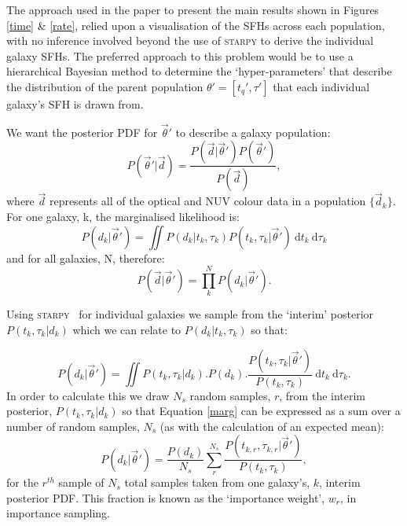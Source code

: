 \documentclass[useAMS,usenatbib]{mn2e}
\def\secondchange    {\color{srv} }
\begin{document}
{\secondchange The approach used in the paper to present the main results shown in Figures \ref{time} \& \ref{rate}, relied upon a visualisation of the SFHs across each population, with no inference involved beyond the use of \textsc{starpy} to derive the individual galaxy SFHs. The preferred approach to this problem would be to use a hierarchical Bayesian method to determine the `hyper-parameters' that describe the distribution of the parent population $\theta' = [t_q', \tau']$ that each individual galaxy's SFH is drawn from. 

We want the posterior PDF for $\vec{\theta}'$ to describe a galaxy population:
\begin{equation}\label{hyper}
P(\vec{\theta}'|\vec{d}) = \frac{P(\vec{d}|\vec{\theta}')P(\vec{\theta}')}{P(\vec{d})}, 
\end{equation}
where $\vec{d}$ represents all of the optical and NUV colour data in a population $\{\vec{d}_k\}$. For one galaxy, k, the marginalised likelihood is:
\begin{equation}\label{one}
P(d_k|\vec{\theta}') = \iint \! P(d_k|t_k, \tau_k) P(t_k, \tau_k|\vec{\theta}') \ \mathrm{d}t_k ~ \mathrm{d}\tau_k
\end{equation}
and for all galaxies, N, therefore: 
\begin{equation}
P(\vec{d}|\vec{\theta}') = \prod_k^N P(d_k|\vec{\theta}').
\end{equation}

Using \textsc{starpy}~ for individual galaxies we sample from the `interim' posterior $P(t_k, \tau_k|d_k)$ which we can relate to $P(d_k|t_k, \tau_k)$  so that:

\begin{equation}\label{marg}
P(d_k|\vec{\theta}') = \iint  \! P(t_k, \tau_k|d_k) . P(d_k) . \frac{P(t_k, \tau_k|\vec{\theta}')}{P(t_k, \tau_k)} \ \mathrm{d}t_k ~ \mathrm{d}\tau_k.
\end{equation}
In order to calculate this we draw $N_s$ random samples, $r$, from the interim posterior, $P(t_k, \tau_k|d_k)$ so that Equation \ref{marg} can be expressed as a sum over a number of random samples, $N_s$ (as with the calculation of an expected mean):
\begin{equation}\label{imp}
P(d_k|\vec{\theta}') = \frac{P(d_k)}{N_s} \sum_r^{N_s} \frac{P(t_{k,r}, \tau_{k,r}|\vec{\theta}')}{P(t_k, \tau_k)},
\end{equation}
for the $r^{th}$ sample of $N_s$ total samples taken from one galaxy's, $k$,  interim posterior PDF. This fraction is known as the `importance weight', $w_r$, in importance sampling. 

}
\end{document}
